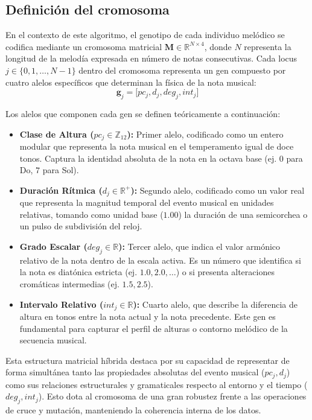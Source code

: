 \documentclass[12pt]{report}
\begin{document}
\subsection{Definición del cromosoma}

En el contexto de este algoritmo, el genotipo de cada individuo melódico se codifica mediante un cromosoma matricial $\mathbf{M} \in \mathbb{R}^{N \times 4}$, donde $N$ representa la longitud de la melodía expresada en número de notas consecutivas. Cada locus $j \in \{0, 1, \dots, N-1\}$ dentro del cromosoma representa un gen compuesto por cuatro alelos específicos que determinan la física de la nota musical:
\begin{equation}
    \mathbf{g}_j = \big[ pc_j, d_j, deg_j, int_j \big]
\end{equation}

Los alelos que componen cada gen se definen teóricamente a continuación:
\begin{itemize}
    \item \textbf{Clase de Altura ($pc_j \in \mathbb{Z}_{12}$):} Primer alelo, codificado como un entero modular que representa la nota musical en el temperamento igual de doce tonos. Captura la identidad absoluta de la nota en la octava base (ej. $0$ para Do, $7$ para Sol).
    \item \textbf{Duración Rítmica ($d_j \in \mathbb{R}^+$):} Segundo alelo, codificado como un valor real que representa la magnitud temporal del evento musical en unidades relativas, tomando como unidad base ($1.00$) la duración de una semicorchea o un pulso de subdivisión del reloj.
    \item \textbf{Grado Escalar ($deg_j \in \mathbb{R}$):} Tercer alelo, que indica el valor armónico relativo de la nota dentro de la escala activa. Es un número que identifica si la nota es diatónica estricta (ej. $1.0, 2.0, \dots$) o si presenta alteraciones cromáticas intermedias (ej. $1.5, 2.5$).
    \item \textbf{Intervalo Relativo ($int_j \in \mathbb{R}$):} Cuarto alelo, que describe la diferencia de altura en tonos entre la nota actual y la nota precedente. Este gen es fundamental para capturar el perfil de alturas o contorno melódico de la secuencia musical.
\end{itemize}

Esta estructura matricial híbrida destaca por su capacidad de representar de forma simultánea tanto las propiedades absolutas del evento musical ($pc_j, d_j$) como sus relaciones estructurales y gramaticales respecto al entorno y el tiempo ($deg_j, int_j$). Esto dota al cromosoma de una gran robustez frente a las operaciones de cruce y mutación, manteniendo la coherencia interna de los datos.
\end{document}
